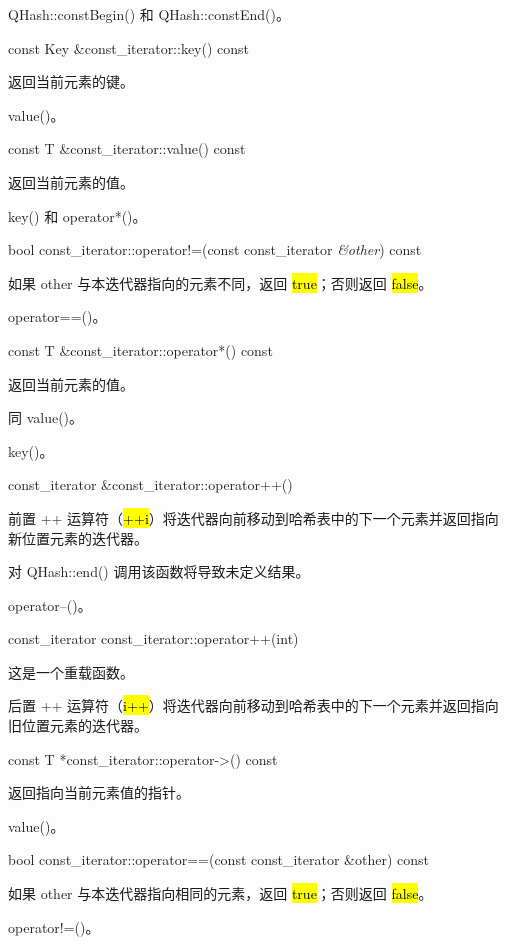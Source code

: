 \begin{notice}[另请参阅]
QHash::constBegin() 和 QHash::constEnd()。
\end{notice}


const Key \&const\_iterator::key() const

返回当前元素的键。



\begin{notice}[另请参阅]
 value()。
\end{notice}

const T \&const\_iterator::value() const

返回当前元素的值。



\begin{notice}[另请参阅]
 key() 和 operator*()。
\end{notice}

bool const\_iterator::operator!=(const const\_iterator \emph{\&other}) const

如果 other 与本迭代器指向的元素不同，返回 \hl{true}；否则返回 \hl{false}。


\begin{notice}[另请参阅]
operator==()。
\end{notice}

const T \&const\_iterator::operator*() const

返回当前元素的值。

同 value()。

\begin{notice}[另请参阅]
key()。
\end{notice}


const\_iterator \&const\_iterator::operator++()

前置 ++ 运算符（\hl{++i}）将迭代器向前移动到哈希表中的下一个元素并返回指向新位置元素的迭代器。

对 QHash::end() 调用该函数将导致未定义结果。

\begin{notice}[另请参阅]
operator--()。
\end{notice}

const\_iterator const\_iterator::operator++(int)

这是一个重载函数。

后置 ++ 运算符（\hl{i++}）将迭代器向前移动到哈希表中的下一个元素并返回指向
旧位置元素的迭代器。

const T *const\_iterator::operator->() const

返回指向当前元素值的指针。

\begin{notice}[另请参阅]
value()。
\end{notice}

bool const\_iterator::operator==(const const\_iterator \&other) const

如果 other 与本迭代器指向相同的元素，返回 \hl{true}；否则返回 \hl{false}。

\begin{notice}[另请参阅]
operator!=()。
\end{notice}
